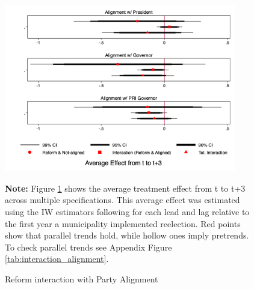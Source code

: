 \documentclass[12pt]{amsart}
\numberwithin{equation}{section}
\theoremstyle{definition}
\theoremstyle{definition}
\theoremstyle{definition}
\begin{document}
\begin{figure}[H]   
\centering
 \caption{Reform interaction with Party Alignment}
 \label{fig:alignment}
\includegraphics[width=0.9\textwidth]{../Figures/interaction_alignment_full.png}
       \captionsetup{justification=centering}
       
 \textbf{Note:} Figure \ref{fig:alignment} shows the average treatment effect from t to t+3 across multiple specifications. This average effect was estimated using the IW estimators following \citet{abraham_sun_2020} for each lead and lag relative to the first year a municipality implemented reelection. Red points show that parallel trends hold, while hollow ones imply pretrends. To check parallel trends see Appendix Figure \ref{tab:interaction_alignment}.  
\end{figure}  
\end{document}
